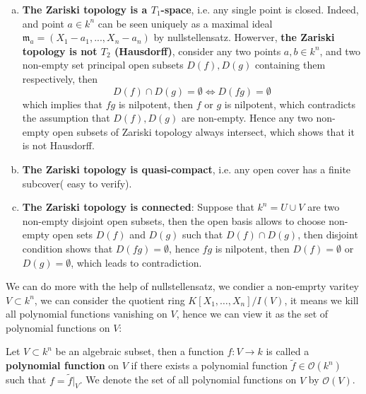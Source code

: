 \begin{enumerate}[(a)]
    \item\textbf{ The Zariski topology is a \(T_1\)-space}, i.e. any single point is closed. Indeed, and point \(a \in k^n\) can be seen uniquely as a maximal ideal \(\mathfrak{m}_a = (X_1 - a_1,...,X_n - a_n)\) by nullstellensatz. Howerver, \textbf{the Zariski topology is not \(T_2\) (Hausdorff)}, consider any two points \(a,b \in k^n\), and two non-empty set principal open subsets \(D(f), D(g)\) containing them respectively, then
    \[D(f) \cap D(g) = \emptyset \iff D(fg) = \emptyset\]
    which implies that \(fg\) is nilpotent, then \(f\) or \(g\) is nilpotent,
    which contradicts the assumption that \(D(f),D(g)\) are non-empty. Hence any two non-empty open subsets of Zariski topology always intersect, which shows that it is not Hausdorff.\\
    
    \item \textbf{The Zariski topology is quasi-compact}, i.e. any open cover has a finite subcover( easy to verify).
    
    \item \textbf{The Zariski topology is connected}: Suppose that \(k^n = U \cup V\) are two non-empty disjoint open subsets, then the open basis allows to choose non-empty open sets \(D(f)\) and \(D(g)\) such that \(D(f)\cap D(g)\), then disjoint condition shows that \(D(fg) = \emptyset\), hence \(fg\) is nilpotent, then \(D(f) =\emptyset\) or \(D(g) = \emptyset\), which leads to contradiction.
\end{enumerate}
\newpage
We can do more with the help of nullstellensatz, we condier a non-emprty varitey \(V \subset k^n\), we can consider the quotient ring \(K[X_1,\dots,X_n]/I(V)\), it means we kill all polynomial functions vanishing on \(V\), hence we can view it as the set of polynomial functions on \(V\):
\begin{definition}
    Let \(V \subset k^n\) be an algebraic subset, then a function \(f: V \to k\) is called a \textbf{polynomial function} on \(V\) if there exists a polynomial function \(\tilde{f} \in \mathcal{O}(k^n)\) such that \(f = \tilde{f}|_V\). We denote the set of all polynomial functions on \(V\) by \(\mathcal{O}(V)\).\\
\end{definition}

